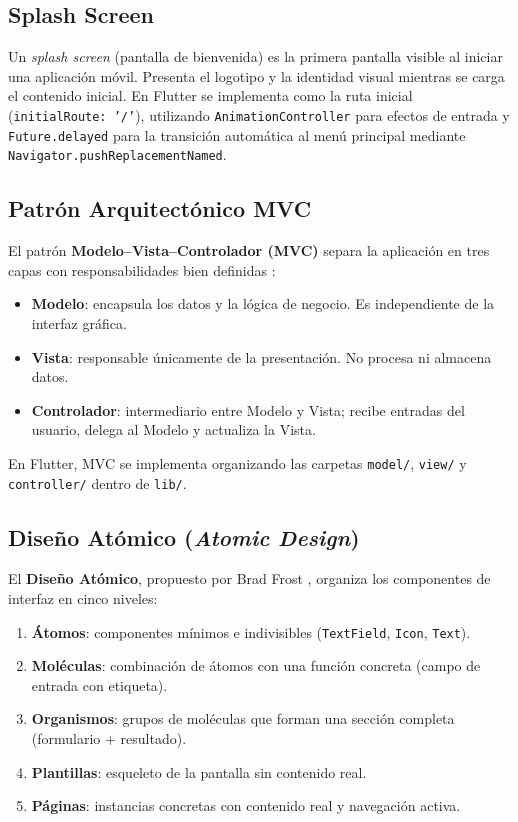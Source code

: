 \documentclass[12pt,a4paper]{article}
\begin{document}
\subsection{Splash Screen}

Un \textit{splash screen} (pantalla de bienvenida) es la primera pantalla visible al iniciar una aplicación móvil. Presenta el logotipo y la identidad visual mientras se carga el contenido inicial. En Flutter se implementa como la ruta inicial (\texttt{initialRoute: '/'}), utilizando \texttt{AnimationController} para efectos de entrada y \texttt{Future.delayed} para la transición automática al menú principal mediante \texttt{Navigator.pushReplacementNamed}.

\subsection{Patrón Arquitectónico MVC}

El patrón \textbf{Modelo--Vista--Controlador (MVC)} separa la aplicación en tres capas con responsabilidades bien definidas \cite{gamma1994}:

\begin{itemize}
  \item \textbf{Modelo}: encapsula los datos y la lógica de negocio. Es independiente de la interfaz gráfica.
  \item \textbf{Vista}: responsable únicamente de la presentación. No procesa ni almacena datos.
  \item \textbf{Controlador}: intermediario entre Modelo y Vista; recibe entradas del usuario, delega al Modelo y actualiza la Vista.
\end{itemize}

En Flutter, MVC se implementa organizando las carpetas \texttt{model/}, \texttt{view/} y \texttt{controller/} dentro de \texttt{lib/}.

\subsection{Diseño Atómico (\textit{Atomic Design})}

El \textbf{Diseño Atómico}, propuesto por Brad Frost \cite{frost2016}, organiza los componentes de interfaz en cinco niveles:

\begin{enumerate}
  \item \textbf{Átomos}: componentes mínimos e indivisibles (\texttt{TextField}, \texttt{Icon}, \texttt{Text}).
  \item \textbf{Moléculas}: combinación de átomos con una función concreta (campo de entrada con etiqueta).
  \item \textbf{Organismos}: grupos de moléculas que forman una sección completa (formulario + resultado).
  \item \textbf{Plantillas}: esqueleto de la pantalla sin contenido real.
  \item \textbf{Páginas}: instancias concretas con contenido real y navegación activa.
\end{enumerate}
\end{document}
